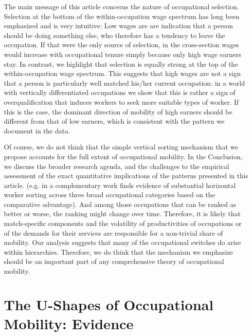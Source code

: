\documentclass[12pt]{article}
\newcommand{\highlightR}[1]{{\emph{\color{MyRed}{#1}}}}
\theoremstyle{definition}
\begin{document}
The main message of this article concerns the nature of occupational selection. Selection at the bottom of the within-occupation wage spectrum has long been emphasized and is very intuitive: Low wages are are indication that a person should be doing something else, who therefore has a tendency to leave the occupation. If that were the only source of selection, in the cross-section wages would increase with occupational tenure simply because only high wage earners stay. In contrast, we highlight that selection is equally strong at the top of the within-occupation wage spectrum. This suggests that high wages are not a sign that a person is particularly well matched his/her current occupation: in a world with vertically differentiated occupations we show that this is rather a sign of overqualification that induces workers to seek more suitable types of worker. If this is the case, the dominant direction of mobility of high earners should be different from that of low earners, which is consistent with the pattern we document in the data. 

Of course, we do not think that the simple vertical sorting mechanism that we propose accounts for the full extent of occupational mobility. In the Conclusion, we discuss the broader research agenda, and the challenges to the empirical assessment of the exact quantitative implications of the patterns presented in this article. \highlightR{Both vertical and horizontal moves likely arise in the labour market, i.e. some occupations are considered better than others whereas some are just different and people switch along both of these dimensions} (e.g. in a complementary work \citet{papageorgiouLearningYourComparative2014} finds evidence of substantial horizontal worker sorting across three broad occupational categories based on the comparative advantage). And among those occupations that can be ranked as better or worse, the ranking might change over time. Therefore, it is likely that match-specific components and the volatility of productivities of occupations or of the demands for their services are responsible for a non-trivial share of mobility. \highlightR{An important part of a future agenda is to identify which occupations form vertical hierarchies to identify the costs of switching within and across hierarchies.} Our analysis suggests that many of the occupational switches do arise within hierarchies. Therefore, we do think that the mechanism we emphasize should be an important part of any comprehensive theory of occupational mobility.

\section{The U-Shapes of Occupational Mobility: Evidence}
\end{document}
